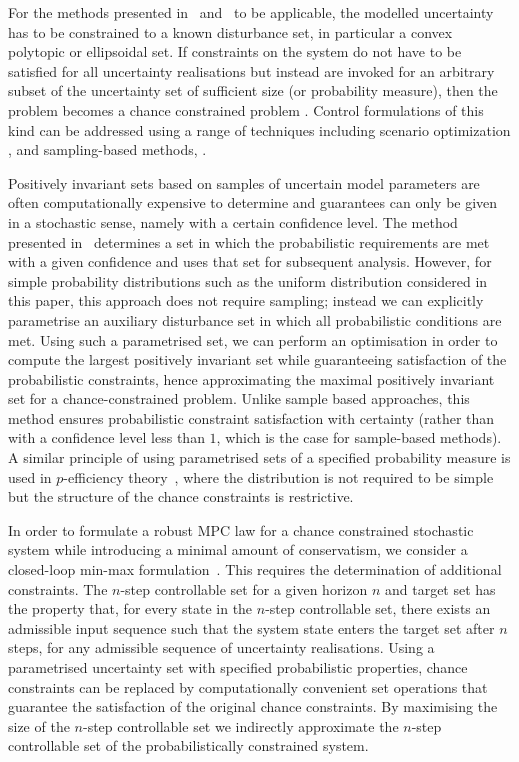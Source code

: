 \documentclass{ifacconf}
\begin{document}
For the methods presented in~\cite{Kolmanovsky:1998} and~\cite{blanchini:2007} to be applicable, the modelled uncertainty has to be constrained to a known disturbance set, in particular a convex polytopic or ellipsoidal set.
%
If constraints on the system do not have to be satisfied for all uncertainty realisations but instead are invoked for an arbitrary subset of the uncertainty set of sufficient size (or probability measure), then the problem becomes a chance constrained problem \cite[see e.g.][]{Kall1994}.
%
Control formulations of this kind can be addressed using a range of techniques including scenario optimization \citep[e.g.][]{Calafiore2010}, and sampling-based methods, \citep[e.g.][]{Margellos2014,Zhang2015,Fleming2016}.
%

Positively invariant sets based on samples of uncertain model parameters are often computationally expensive to determine and guarantees can only be given in a stochastic sense, namely with a certain confidence level.
%
The method presented in~\cite{Zhang2015} determines a set in which the probabilistic requirements are met with a given confidence and uses that set for subsequent analysis.
%
However, for simple probability distributions such as the uniform distribution considered in this paper, this approach does not require sampling; instead we can explicitly parametrise an auxiliary disturbance set in which all probabilistic conditions are met.
%
Using such a parametrised set, we can perform an optimisation
in order to compute the largest positively invariant set while guaranteeing satisfaction of the probabilistic constraints, hence approximating the maximal positively invariant set for a chance-constrained problem.
%
Unlike sample based approaches, this method ensures probabilistic constraint satisfaction with certainty (rather than with a confidence level less than $1$, which is the case for sample-based methods).
%
A similar principle of using parametrised sets of a specified probability measure is used in $p$-efficiency theory~\citep{Dentcheva2009}, where the distribution is not required to be simple but the structure of the chance constraints is restrictive.

In order to formulate a robust MPC law for a chance constrained stochastic system while introducing a minimal amount of conservatism, we consider a closed-loop min-max formulation~\citep{Lee:1997}. This requires the determination of additional constraints.
%
The $n$-step controllable set for a given horizon $n$ and target set \citep[see e.g.][]{bertsekas71} has the property that, for every state in the $n$-step controllable set, there exists an admissible input sequence such that the system state enters the target set after $n$ steps, for any admissible sequence of uncertainty realisations.
%
Using a parametrised uncertainty set with specified probabilistic properties, chance constraints can be replaced by computationally convenient set operations that guarantee the satisfaction of the original chance constraints.
%
By maximising the size of the $n$-step controllable set we indirectly approximate the $n$-step controllable set of the probabilistically constrained system.
\end{document}
